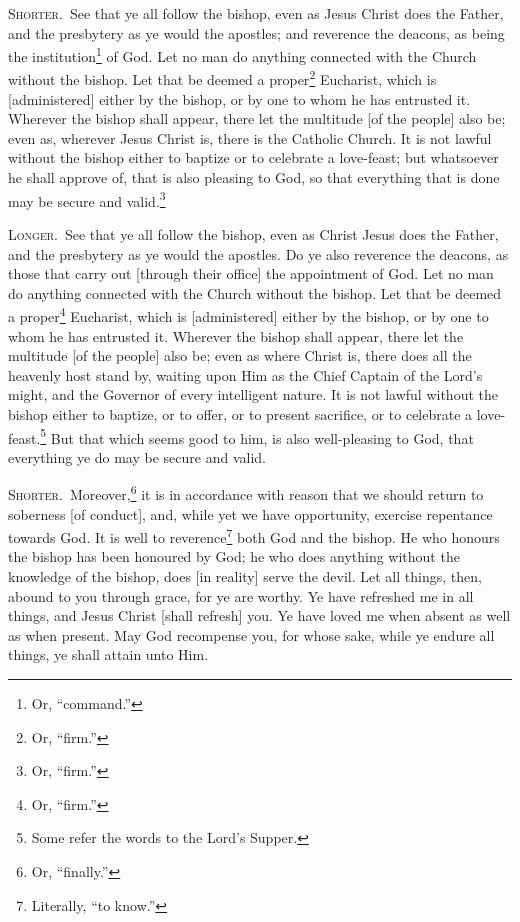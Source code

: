 
\textsc{Shorter.}~See that ye all follow the bishop, even as Jesus Christ does the Father, and the presbytery as ye would the apostles; and reverence the deacons, as being the institution\footnote{Or, “command.”} of God. Let no man do anything connected with the Church without the bishop. Let that be deemed a proper\footnote{Or, “firm.”} Eucharist, which is [administered] either  by the bishop, or by one to whom he has entrusted it. Wherever the bishop shall appear, there let the multitude [of the people] also be; even as, wherever Jesus Christ is, there is the Catholic Church. It is not lawful without the bishop either to baptize or to celebrate a love-feast; but whatsoever he shall approve of, that is also pleasing to God, so that everything that is done may be secure and valid.\footnote{Or, “firm.”}

\textsc{Longer.}~See that ye all follow the bishop, even as Christ Jesus does the Father, and the presbytery as ye would the apostles. Do ye also reverence the deacons, as those that carry out [through their office] the appointment of God. Let no man do anything connected with the Church without the bishop. Let that be deemed a proper\footnote{Or, “firm.”} Eucharist, which is [administered] either by the bishop, or by one to whom he has entrusted it. Wherever the bishop shall appear, there let the multitude [of the people] also be; even as where Christ is, there does all the heavenly host stand by, waiting upon Him as the Chief Captain of the Lord’s might, and the Governor of every intelligent nature. It is not lawful without the bishop either to baptize, or to offer, or to present sacrifice, or to celebrate a love-feast.\footnote{Some refer the words to the Lord’s Supper.} But that which seems good to him, is also well-pleasing to God, that everything ye do may be secure and valid.


\textsc{Shorter.}~Moreover,\footnote{Or, “finally.”} it is in accordance with reason that we should return to soberness [of conduct], and, while yet we have opportunity, exercise repentance towards God. It is well to reverence\footnote{Literally, “to know.”} both God and the bishop. He who honours the bishop has been honoured by God; he who does anything without the knowledge of the bishop, does [in reality] serve the devil. Let all things, then, abound to you through grace, for ye are worthy. Ye have refreshed me in all things, and Jesus Christ [shall refresh] you. Ye have loved me when absent as well as when present. May God recompense you, for whose sake, while ye endure all things, ye shall attain unto Him.


